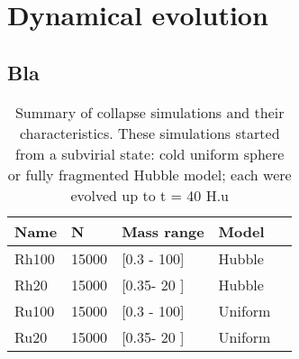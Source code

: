 


\chapter{Dynamical evolution} 
\label{ChapterDE}


\section{Bla}


%

%
\begin{table}
\begin{center}
\caption{Summary of collapse simulations and their characteristics. These simulations started from a subvirial state: cold uniform sphere or fully fragmented Hubble model; each were evolved up to t = 40 H.u}
\label{Tab:2_evolution_models}
\begin{tabularx}{\linewidth}{XXlXX}
\hline
Name & N & Mass range & Model \\
\hline
Rh100 & 15000 & [0.3 - 100] & Hubble  \\
Rh20 & 15000 & [0.35- 20 ] & Hubble  \\
Ru100 & 15000 & [0.3 - 100] & Uniform  \\
Ru20 & 15000 & [0.35- 20 ] & Uniform  \\
\hline
\end{tabularx}
\end{center}
\end{table}



